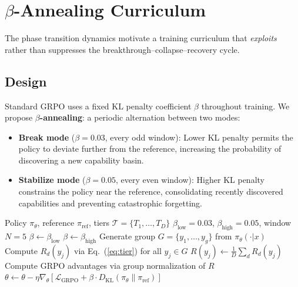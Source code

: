 \documentclass[sigconf]{acmart}
\begin{document}
\section{$\beta$-Annealing Curriculum}
\label{sec:curriculum}

The phase transition dynamics motivate a training curriculum that \textit{exploits} rather than suppresses the breakthrough--collapse--recovery cycle.

\subsection{Design}

Standard GRPO uses a fixed KL penalty coefficient $\beta$ throughout training. We propose \textbf{$\beta$-annealing}: a periodic alternation between two modes:

\begin{itemize}
    \item \textbf{Break mode} ($\beta = 0.03$, every odd window): Lower KL penalty permits the policy to deviate further from the reference, increasing the probability of discovering a new capability basin.
    \item \textbf{Stabilize mode} ($\beta = 0.05$, every even window): Higher KL penalty constrains the policy near the reference, consolidating recently discovered capabilities and preventing catastrophic forgetting.
\end{itemize}

\begin{algorithm}[t]
\caption{$\beta$-Annealing GRPO}
\label{alg:beta}
\begin{algorithmic}[1]
\REQUIRE Policy $\pi_\theta$, reference $\pi_{\text{ref}}$, tiers $\mathcal{T} = \{T_1, \ldots, T_D\}$
\REQUIRE $\beta_{\text{low}} = 0.03$, $\beta_{\text{high}} = 0.05$, window $N = 5$
        \STATE $\beta \leftarrow \beta_{\text{low}}$ 
    \ELSE
        \STATE $\beta \leftarrow \beta_{\text{high}}$ 
    \ENDIF
    \STATE Generate group $G = \{y_1, \ldots, y_g\}$ from $\pi_\theta(\cdot | x)$
        \STATE Compute $R_d(y_j)$ via Eq.~(\ref{eq:tier}) for all $y_j \in G$
    \ENDFOR
    \STATE $R(y_j) \leftarrow \frac{1}{D}\sum_d R_d(y_j)$ 
    \STATE Compute GRPO advantages via group normalization of $R$
    \STATE $\theta \leftarrow \theta - \eta \nabla_\theta \left[\mathcal{L}_{\text{GRPO}} + \beta \cdot D_{\text{KL}}(\pi_\theta \| \pi_{\text{ref}})\right]$
\ENDFOR
\end{algorithmic}
\end{algorithm}
\end{document}
